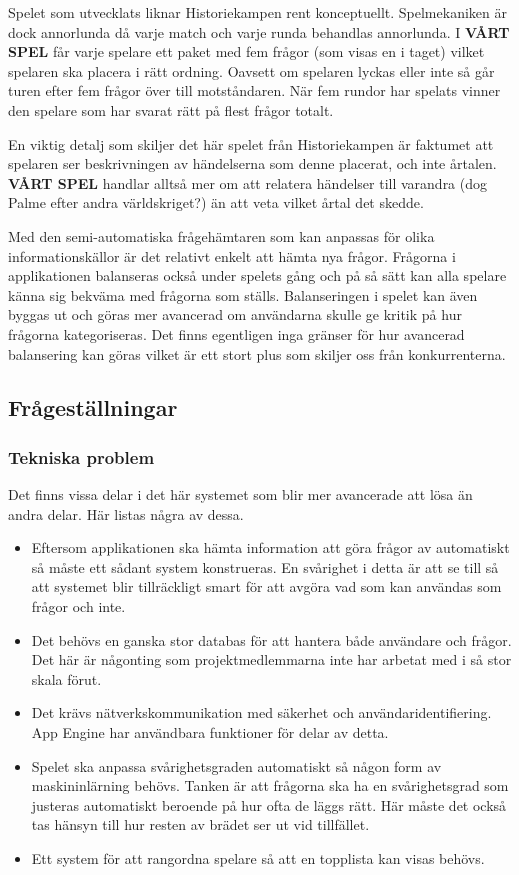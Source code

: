 \documentclass[a4paper, 11pt]{article}
\begin{document}
Spelet som utvecklats liknar Historiekampen rent konceptuellt. Spelmekaniken är dock annorlunda då varje match och varje runda behandlas annorlunda. I \textbf{VÅRT SPEL} får varje spelare ett paket med fem frågor (som visas en i taget) vilket spelaren ska placera i rätt ordning. Oavsett om spelaren lyckas eller inte så går turen efter fem frågor över till motståndaren. När fem rundor har spelats vinner den spelare som har svarat rätt på flest frågor totalt. 

En viktig detalj som skiljer det här spelet från Historiekampen är faktumet att spelaren ser beskrivningen av händelserna som denne placerat, och inte årtalen. \textbf{VÅRT SPEL} handlar alltså mer om att relatera händelser till varandra (dog Palme efter andra världskriget?) än att veta vilket årtal det skedde.

Med den semi-automatiska frågehämtaren som kan anpassas för olika informationskällor är det relativt enkelt att hämta nya frågor. Frågorna i applikationen balanseras också under spelets gång och på så sätt kan alla spelare känna sig bekväma med frågorna som ställs. Balanseringen i spelet kan även byggas ut och göras mer avancerad om användarna skulle ge kritik på hur frågorna kategoriseras. Det finns egentligen inga gränser för hur avancerad balansering kan göras vilket är ett stort plus som skiljer oss från konkurrenterna.

\subsection{Frågeställningar}

\subsubsection{Tekniska problem}
Det finns vissa delar i det här systemet som blir mer avancerade att lösa än andra delar. Här listas några av dessa.
\begin{itemize}
\item Eftersom applikationen ska hämta information att göra frågor av automatiskt så måste ett sådant system konstrueras. En svårighet i detta är att se till så att systemet blir tillräckligt smart för att avgöra vad som kan användas som frågor och inte.
\item Det behövs en ganska stor databas för att hantera både användare och frågor. Det här är någonting som projektmedlemmarna inte har arbetat med i så stor skala förut.
\item Det krävs nätverkskommunikation med säkerhet och användaridentifiering. App Engine har användbara funktioner för delar av detta.
\item Spelet ska anpassa svårighetsgraden automatiskt så någon form av maskininlärning behövs. Tanken är att frågorna ska ha en svårighetsgrad som justeras automatiskt beroende på hur ofta de läggs rätt. Här måste det också tas hänsyn till hur resten av brädet ser ut vid tillfället.
\item Ett system för att rangordna spelare så att en topplista kan visas behövs.
\end{itemize}
\end{document}
